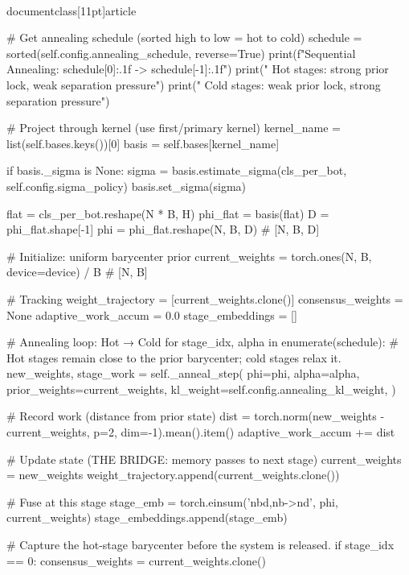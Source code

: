 \\documentclass[11pt]{article}
\begin{document}
\begin{CodeBlock}
{{{{{{{{        # Get annealing schedule (sorted high to low = hot to cold)
        schedule = sorted(self.config.annealing_schedule, reverse=True)
        print(f"\n[Track 3] Sequential Annealing: {schedule[0]:.1f} -> {schedule[-1]:.1f}")
        print("  Hot stages: strong prior lock, weak separation pressure")
        print("  Cold stages: weak prior lock, strong separation pressure")

        # Project through kernel (use first/primary kernel)
        kernel_name = list(self.bases.keys())[0]
        basis = self.bases[kernel_name]

        if basis._sigma is None:
            sigma = basis.estimate_sigma(cls_per_bot, self.config.sigma_policy)
            basis.set_sigma(sigma)

        flat = cls_per_bot.reshape(N * B, H)
        phi_flat = basis(flat)
        D = phi_flat.shape[-1]
        phi = phi_flat.reshape(N, B, D)  # [N, B, D]

        # Initialize: uniform barycenter prior
        current_weights = torch.ones(N, B, device=device) / B  # [N, B]

        # Tracking
        weight_trajectory = [current_weights.clone()]
        consensus_weights = None
        adaptive_work_accum = 0.0
        stage_embeddings = []

        # Annealing loop: Hot → Cold
        for stage_idx, alpha in enumerate(schedule):
            # Hot stages remain close to the prior barycenter; cold stages relax it.
            new_weights, stage_work = self._anneal_step(
                phi=phi,
                alpha=alpha,
                prior_weights=current_weights,
                kl_weight=self.config.annealing_kl_weight,
            )

            # Record work (distance from prior state)
            dist = torch.norm(new_weights - current_weights, p=2, dim=-1).mean().item()
            adaptive_work_accum += dist

            # Update state (THE BRIDGE: memory passes to next stage)
            current_weights = new_weights
            weight_trajectory.append(current_weights.clone())

            # Fuse at this stage
            stage_emb = torch.einsum('nbd,nb->nd', phi, current_weights)
            stage_embeddings.append(stage_emb)

            # Capture the hot-stage barycenter before the system is released.
            if stage_idx == 0:
                consensus_weights = current_weights.clone()

}}}}}}}}
\end{CodeBlock}
\end{document}
